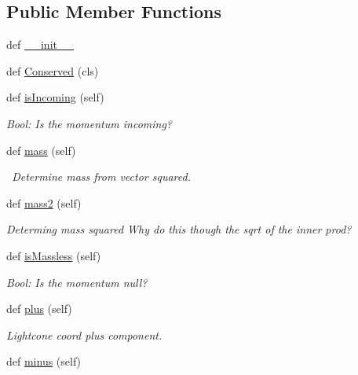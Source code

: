 \subsection*{Public Member Functions}
\begin{DoxyCompactItemize}
\item 
def \hyperlink{class_py_spinor_1_1_momenta_1_1_momenta_a58f6631f07a77727193b8cd3040869b2}{\+\_\+\+\_\+init\+\_\+\+\_\+}
\item 
def \hyperlink{class_py_spinor_1_1_momenta_1_1_momenta_a52d0a5b0986124edaa369b82bfc793b4}{Conserved} (cls)
\item 
def \hyperlink{class_py_spinor_1_1_momenta_1_1_momenta_a7540ed7b06c619de35e7727517f07d47}{is\+Incoming} (self)
\begin{DoxyCompactList}\small\item\em Bool\+: Is the momentum incoming? \end{DoxyCompactList}\item 
def \hyperlink{class_py_spinor_1_1_momenta_1_1_momenta_a670123d7eed72133654307b9b36c5daa}{mass} (self)
\begin{DoxyCompactList}\small\item\em  \+Determine mass from vector squared. \end{DoxyCompactList}\item 
def \hyperlink{class_py_spinor_1_1_momenta_1_1_momenta_ac2eb2567e99f8d68adaafc358672e2e2}{mass2} (self)
\begin{DoxyCompactList}\small\item\em Determing mass squared Why do this though the sqrt of the inner prod? \end{DoxyCompactList}\item 
def \hyperlink{class_py_spinor_1_1_momenta_1_1_momenta_a3710564fb7b6ea3054884395e316ca36}{is\+Massless} (self)
\begin{DoxyCompactList}\small\item\em Bool\+: Is the momentum null? \end{DoxyCompactList}\item 
def \hyperlink{class_py_spinor_1_1_momenta_1_1_momenta_af43d67ac68750a1bf9489886fd5882ca}{plus} (self)
\begin{DoxyCompactList}\small\item\em Lightcone coord plus component. \end{DoxyCompactList}\item 
def \hyperlink{class_py_spinor_1_1_momenta_1_1_momenta_ac812f3fb38392ef3ec74a24513f0afe0}{minus} (self)

\end{DoxyCompactItemize}
